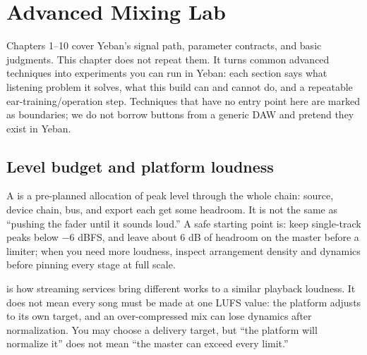 \chapter{Advanced Mixing Lab}
\label{chap:advanced-lab}


Chapters 1--10 cover Yeban's signal path, parameter contracts, and basic judgments. This chapter does not repeat them. It turns common advanced techniques into experiments you can run in Yeban: each section says what listening problem it solves, what this build can and cannot do, and a repeatable ear-training/operation step. Techniques that have no entry point here are marked as boundaries; we do not borrow buttons from a generic DAW and pretend they exist in Yeban.

\section{Level budget and platform loudness}

A  is a pre-planned allocation of peak level through the whole chain: source, device chain, bus, and export each get some headroom. It is not the same as ``pushing the fader until it sounds loud.'' A safe starting point is: keep single-track peaks below $-6$ dBFS, and leave about 6 dB of headroom on the master before a limiter; when you need more loudness, inspect arrangement density and dynamics before pinning every stage at full scale.

 is how streaming services bring different works to a similar playback loudness. It does not mean every song must be made at one LUFS value: the platform adjusts to its own target, and an over-compressed mix can lose dynamics after normalization. You may choose a delivery target, but ``the platform will normalize it'' does not mean ``the master can exceed every limit.''

